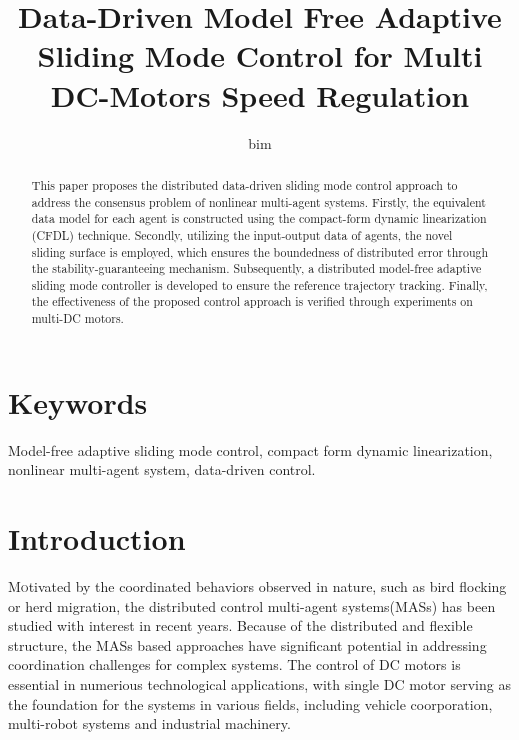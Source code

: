 \documentclass[journal,onecolumn]{IEEEtran}
\title{\LARGE Data-Driven Model Free Adaptive Sliding Mode Control for Multi DC-Motors Speed Regulation}
\author{bim}
\begin{document}
\maketitle


\begin{abstract}
    This paper proposes the distributed data-driven sliding mode control approach to address the consensus problem of nonlinear multi-agent systems. Firstly, the equivalent data model for each agent is constructed using the compact-form dynamic linearization (CFDL) technique. Secondly, utilizing the input-output data of agents, the novel sliding surface is employed, which ensures the boundedness of distributed error through the stability-guaranteeing mechanism. Subsequently, a distributed model-free adaptive sliding mode controller is developed to ensure the reference trajectory tracking. Finally, the effectiveness of the proposed control approach is verified through experiments on multi-DC motors.
\end{abstract}


\section*{Keywords}
Model-free adaptive sliding mode control, compact form dynamic linearization, nonlinear multi-agent system, data-driven control.




\section{Introduction}\label{section:1}

\lettrine{M}otivated by the coordinated behaviors observed in nature, such as bird flocking or herd migration, the distributed control multi-agent systems(MASs) has been studied with interest in recent years.\cite{1} Because of the distributed and flexible structure, the MASs based approaches have significant potential in addressing coordination challenges for complex systems\cite{2}. The control of DC motors is essential in numerious technological applications, with single DC motor serving as the foundation for the systems in various fields, including vehicle coorporation\cite{3}, multi-robot systems and industrial machinery\cite{4}. 
\end{document}
